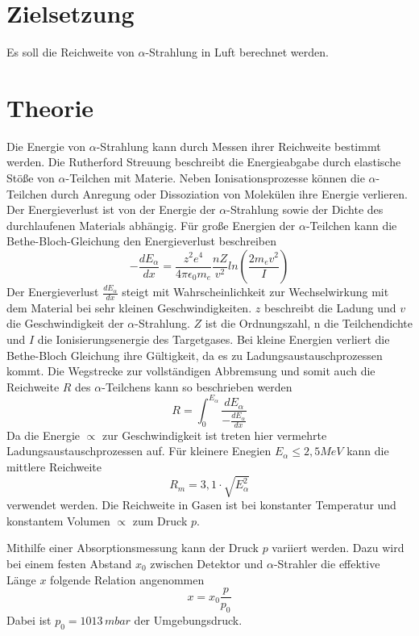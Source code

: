 \section{Zielsetzung}
Es soll die Reichweite von $\alpha$-Strahlung in Luft berechnet werden.
\section{Theorie}
Die Energie von $\alpha$-Strahlung kann durch Messen ihrer Reichweite bestimmt werden.
Die Rutherford Streuung beschreibt die Energieabgabe durch elastische Stöße von
$\alpha$-Teilchen mit Materie.
Neben Ionisationsprozesse können die $\alpha$-Teilchen durch Anregung oder
Dissoziation von Molekülen ihre Energie verlieren.
Der Energieverlust ist von der Energie der $\alpha$-Strahlung sowie der Dichte
des durchlaufenen Materials abhängig.
Für große Energien der $\alpha$-Teilchen kann die Bethe-Bloch-Gleichung
den Energieverlust beschreiben
\begin{equation}
  -\frac{dE_{\alpha}}{dx} = \frac{z^2 e^4}{4 \pi \epsilon_0 m_e}\frac{nZ}{v^2} ln(\frac{2m_e v^2}{I})
  \label{eq:1}
\end{equation}
Der Energieverlust $\frac{dE_{\alpha}}{dx}$ steigt mit Wahrscheinlichkeit zur Wechselwirkung mit
dem Material bei sehr kleinen Geschwindigkeiten.
$z$ beschreibt die Ladung und $v$ die Geschwindigkeit der $\alpha$-Strahlung.
$Z$ ist die Ordnungszahl, n die Teilchendichte und $I$ die Ionisierungsenergie
des Targetgases. Bei kleine Energien verliert die Bethe-Bloch Gleichung ihre Gültigkeit,
da es zu Ladungsaustauschprozessen kommt.
Die Wegstrecke zur vollständigen Abbremsung
und somit auch die Reichweite $R$ des $\alpha$-Teilchens
kann so beschrieben werden
\begin{equation}
  R = \int_{0}^{E_{\alpha}} \frac{dE_\alpha}{-\frac{dE_{\alpha}}{dx}}
  \label{eq:2}
\end{equation}
Da die Energie $\propto $ zur Geschwindigkeit ist treten hier vermehrte Ladungsaustauschprozessen auf.
Für kleinere Enegien $E_\alpha \leq 2,5 MeV$ kann die mittlere Reichweite
\begin{equation*}
  R_m= 3,1 \cdot \sqrt{E^2_\alpha}
  \label{eq:3}
\end{equation*}
verwendet werden.
Die Reichweite in Gasen ist bei konstanter Temperatur und konstantem Volumen $\propto$ zum Druck $p$.

Mithilfe einer Absorptionsmessung kann der Druck $p$ variiert werden. Dazu
wird bei einem festen Abstand $x_0$ zwischen Detektor und $\alpha$-Strahler die
effektive Länge $x$ folgende Relation angenommen
\begin{equation}
  x = x_0 \frac{p}{p_0}
  \label{eq:4}
\end{equation}
Dabei ist $p_0 = 1013 \, mbar$ der Umgebungsdruck.
